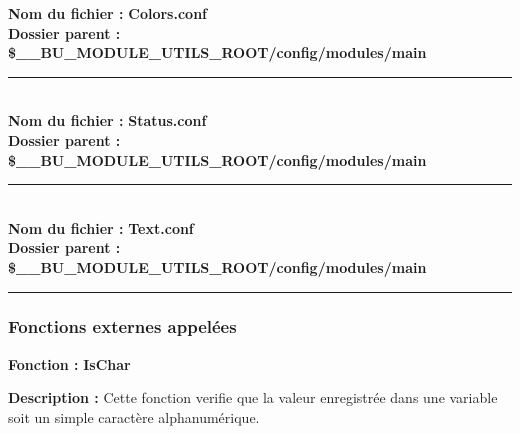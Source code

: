 \documentclass[a4paper,10pt]{article}
\begin{document}
\textbf{Nom du fichier :} \textbf{\color{lime}Colors.conf\color{white}}\\[1\baselineskip]

\textbf{Dossier parent :} \textbf{\color{orange}\$\_\_BU\_MODULE\_UTILS\_ROOT\color{lime}/config/modules/main\color{white}}\\[1\baselineskip]



\color{lime}\par\noindent\rule{\textwidth}{0.4pt}\color{white}\\[1\baselineskip]

\textbf{Nom du fichier :} \textbf{\color{lime}Status.conf\color{white}}\\[1\baselineskip]

\textbf{Dossier parent :} \textbf{\color{orange}\$\_\_BU\_MODULE\_UTILS\_ROOT\color{lime}/config/modules/main\color{white}}\\[1\baselineskip]



\color{lime}\par\noindent\rule{\textwidth}{0.4pt}\color{white}\\[1\baselineskip]

\textbf{Nom du fichier :} \textbf{\color{lime}Text.conf\color{white}}\\[1\baselineskip]

\textbf{Dossier parent :} \textbf{\color{orange}\$\_\_BU\_MODULE\_UTILS\_ROOT\color{lime}/config/modules/main\color{white}}\\[1\baselineskip]



\color{blue}\par\noindent\rule{\textwidth}{0.4pt}\color{white}

\color{blue}
\subsubsection{Fonctions externes appelées}\color{white}

\textbf{Fonction :} \textbf{\color{mauve}IsChar\color{white}}\\[1\baselineskip]

\begin{justify}
    \textbf{Description :} Cette fonction verifie que la valeur enregistrée dans une variable soit un simple caractère alphanumérique.
\end{justify}
\end{document}
